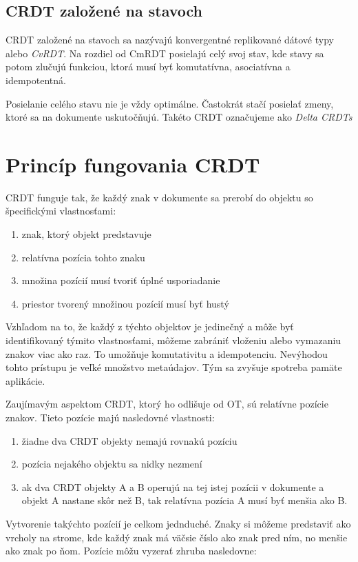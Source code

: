 \subsection{CRDT založené na stavoch}
CRDT založené na stavoch sa nazývajú konvergentné replikované dátové typy alebo \textit{CvRDT}.
Na rozdiel od CmRDT posielajú celý svoj stav, kde stavy sa potom zlučujú funkciou,
ktorá musí byť komutatívna, asociatívna a idempotentná.

Posielanie celého stavu nie je vždy optimálne. Častokrát stačí posielať zmeny, ktoré sa na dokumente
uskutočňujú. Takéto CRDT označujeme ako \textit{Delta CRDTs}

\section{Princíp fungovania CRDT}
CRDT funguje tak, že každý znak v dokumente sa prerobí do objektu so špecifickými vlastnosťami:
\begin{enumerate}
  \label{def_pozicie}
  \item znak, ktorý objekt predstavuje
  \item relatívna pozícia tohto znaku
  \item množina pozícií musí tvoriť úplné usporiadanie
  \item priestor tvorený množinou pozícií musí byť hustý
\end{enumerate}
Vzhľadom na to, že každý z týchto objektov je jedinečný a môže byť identifikovaný
týmito vlastnosťami, môžeme zabrániť vloženiu alebo vymazaniu znakov viac ako raz.
To umožňuje komutativitu a idempotenciu. Nevýhodou tohto prístupu je veľké množstvo metaúdajov.
Tým sa zvyšuje spotreba pamäte aplikácie.

Zaujímavým aspektom CRDT, ktorý ho odlišuje od OT, sú relatívne pozície znakov. Tieto pozície majú
nasledovné vlastnosti:
\begin{enumerate}
  \item žiadne dva CRDT objekty nemajú rovnakú pozíciu
  \item pozícia nejakého objektu sa nidky nezmení
  \item ak dva CRDT objekty A a B operujú na tej istej pozícii v dokumente a objekt A
  nastane skôr než B, tak relatívna pozícia A musí byť menšia ako B.
\end{enumerate}
Vytvorenie takýchto pozícií je celkom jednduché.
Znaky si môžeme predstaviť ako vrcholy na strome, kde každý znak má väčsie číslo ako znak pred
ním, no menšie ako znak po ňom. Pozície môžu vyzerať zhruba nasledovne:

